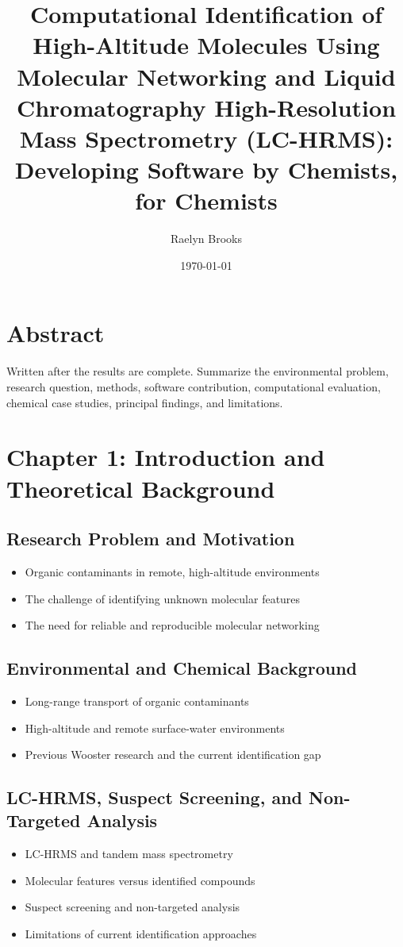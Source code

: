 \documentclass[11pt]{article}
\title{\textbf{Computational Identification of High-Altitude Molecules Using Molecular Networking and Liquid Chromatography High-Resolution Mass Spectrometry (LC-HRMS): Developing Software by Chemists, for Chemists}}
\author{Raelyn Brooks}
\date{\today}
\begin{document}
\maketitle

\nocite{*}

\begin{doublespace}

\section{Abstract}
    Written after the results are complete. Summarize the environmental problem, research question, methods, software contribution, computational evaluation, chemical case studies, principal findings, and limitations.

\section{Chapter 1: Introduction and Theoretical Background}
    \subsection{Research Problem and Motivation}
        \begin{itemize}
            \item Organic contaminants in remote, high-altitude environments
            \item The challenge of identifying unknown molecular features
            \item The need for reliable and reproducible molecular networking
        \end{itemize}

    \subsection{Environmental and Chemical Background}
        \begin{itemize}
            \item Long-range transport of organic contaminants
            \item High-altitude and remote surface-water environments
            \item Previous Wooster research and the current identification gap
        \end{itemize}

    \subsection{LC-HRMS, Suspect Screening, and Non-Targeted Analysis}
        \begin{itemize}
            \item LC-HRMS and tandem mass spectrometry
            \item Molecular features versus identified compounds
            \item Suspect screening and non-targeted analysis
            \item Limitations of current identification approaches
        \end{itemize}


\end{doublespace}
\end{document}
